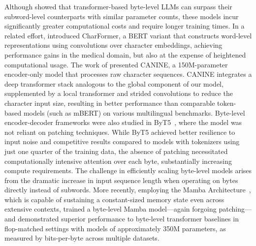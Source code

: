 Although \cite{Choe2019BridgingTG} showed that transformer-based byte-level LLMs can surpass their subword-level counterparts with similar parameter counts, these models incur significantly greater computational costs and require longer training times. In a related effort, \cite{el2020characterbert} introduced CharFormer, a BERT variant that constructs word-level representations using convolutions over character embeddings, achieving performance gains in the medical domain, but also at the expense of heightened computational usage. The work of \cite{clark2022canine} presented CANINE, a 150M-parameter encoder-only model that processes raw character sequences. CANINE integrates a deep transformer stack analogous to the global component of our model, supplemented by a local transformer and strided convolutions to reduce the character input size, resulting in better performance than comparable token-based models (such as mBERT) on various multilingual benchmarks. Byte-level encoder-decoder frameworks were also studied in ByT5~\citep{xue2022byt5}, where the model was not reliant on patching techniques. While ByT5 achieved better resilience to input noise and competitive results compared to models with tokenizers using just one quarter of the training data, the absence of patching necessitated computationally intensive attention over each byte, substantially increasing compute requirements. The challenge in efficiently scaling byte-level models arises from the dramatic increase in input sequence length when operating on bytes directly instead of subwords. More recently, employing the Mamba Architecture~\citep{gu2023mamba}, which is capable of sustaining a constant-sized memory state even across extensive contexts, \cite{wang2024mambabyte} trained a byte-level Mamba model—again forgoing patching—and demonstrated superior performance to byte-level transformer baselines in flop-matched settings with models of approximately 350M parameters, as measured by bits-per-byte across multiple datasets.

